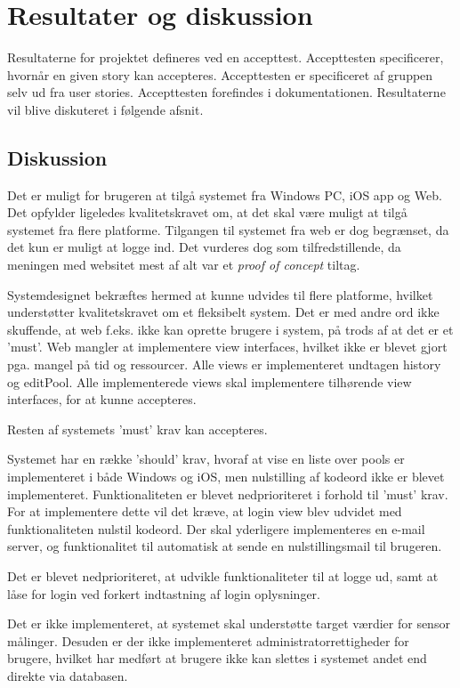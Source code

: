 \chapter{Resultater og diskussion}
Resultaterne for projektet defineres ved en accepttest. Accepttesten specificerer, hvornår en given story kan accepteres. Accepttesten er specificeret af gruppen selv ud fra user stories. Accepttesten forefindes i dokumentationen. Resultaterne vil blive diskuteret i følgende afsnit.

\section{Diskussion}
Det er muligt for brugeren at tilgå systemet fra Windows PC, iOS app og Web. Det opfylder ligeledes kvalitetskravet om, at det skal være muligt at tilgå systemet fra flere platforme. Tilgangen til systemet fra web er dog begrænset, da det kun er muligt at logge ind. Det vurderes dog som tilfredstillende, da meningen med websitet mest af alt var et \textit{proof of concept} tiltag. 

Systemdesignet bekræftes hermed at kunne udvides til flere platforme, hvilket understøtter kvalitetskravet om et fleksibelt system. Det er med andre ord ikke skuffende, at web f.eks. ikke kan oprette brugere i system, på trods af at det er et 'must'. Web mangler at implementere view interfaces, hvilket ikke er blevet gjort pga. mangel på tid og ressourcer. Alle views er implementeret undtagen history og editPool. Alle implementerede views skal implementere tilhørende view interfaces, for at kunne accepteres. 

Resten af systemets 'must' krav kan accepteres.

Systemet har en række 'should' krav, hvoraf at vise en liste over pools er implementeret i både Windows og iOS, men nulstilling af kodeord ikke er blevet implementeret. Funktionaliteten er blevet nedprioriteret i forhold til 'must' krav. For at implementere dette vil det kræve, at login view blev udvidet med funktionaliteten nulstil kodeord. Der skal yderligere implementeres en e-mail server, og funktionalitet til automatisk at sende en nulstillingsmail til brugeren.

Det er blevet nedprioriteret, at udvikle funktionaliteter til at logge ud, samt at låse for login ved forkert indtastning af login oplysninger. 

Det er ikke implementeret, at systemet skal understøtte target værdier for sensor målinger. Desuden er der ikke implementeret administratorrettigheder for brugere, hvilket har medført at brugere ikke kan slettes i systemet andet end direkte via databasen.

